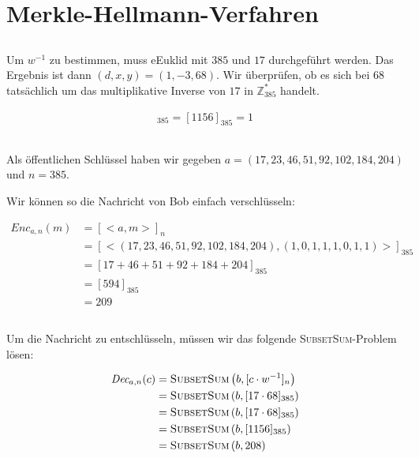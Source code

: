 \documentclass{../crypto}
\begin{document}
\subsection{}


\section{Merkle-Hellmann-Verfahren}

\subsection{}
Um $w^{-1}$ zu bestimmen, muss eEuklid mit $385$ und $17$ durchgeführt werden. Das
Ergebnis ist dann $(d,x,y) = (1,-3,68)$. Wir überprüfen, ob es sich bei $68$
tatsächlich um das multiplikative Inverse von $17$ in $\mathbb{Z}_{385}^*$ handelt.

\begin{align*}
   [17 \cdot 68]_{385} = [1156]_{385} = 1
\end{align*}

\subsection{}

Als öffentlichen Schlüssel haben wir gegeben 
$a = (17, 23, 46, 51, 92, 102, 184, 204)$ und $n = 385$.

Wir können so die Nachricht von Bob einfach verschlüsseln:

\begin{align*}
  \textit{Enc}_{a,n}(m) &= [<a, m>]_n\\
   &= [<(17, 23, 46, 51, 92, 102, 184, 204), (1, 0, 1, 1, 1, 0, 1, 1)>]_{385} \\
   &= [17 + 46 + 51 + 92 + 184 + 204]_{385} \\
   &= [594]_{385} \\
   &= 209
\end{align*}

\subsection{}
Um die Nachricht zu entschlüsseln, müssen wir das folgende 
\textsc{SubsetSum}-Problem lösen:

\begin{align*}
  \textit{Dec}_{a,n}(c) &= \text{\textsc{SubsetSum}}\left(b, [c \cdot w^{-1}]_{n}\right) \\
                        &= \text{\textsc{SubsetSum}}\left(b, [17 \cdot 68]_{385}\right) \\
                        &= \text{\textsc{SubsetSum}}\left(b, [17 \cdot 68]_{385}\right) \\
                        &= \text{\textsc{SubsetSum}}\left(b, [1156]_{385}\right) \\
                        &= \text{\textsc{SubsetSum}}\left(b, 208\right) \\
\end{align*}
\end{document}
